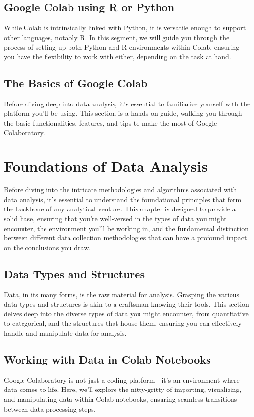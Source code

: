 \documentclass[a4paper,12pt]{book}
\begin{document}
\section{Google Colab using R or Python}
While Colab is intrinsically linked with Python, it is versatile enough to support other languages, notably R. In this segment, we will guide you through the process of setting up both Python and R environments within Colab, ensuring you have the flexibility to work with either, depending on the task at hand.

\section{The Basics of Google Colab}
Before diving deep into data analysis, it's essential to familiarize yourself with the platform you'll be using. This section is a hands-on guide, walking you through the basic functionalities, features, and tips to make the most of Google Colaboratory.

\chapter{Foundations of Data Analysis}
Before diving into the intricate methodologies and algorithms associated with data analysis, it's essential to understand the foundational principles that form the backbone of any analytical venture. This chapter is designed to provide a solid base, ensuring that you're well-versed in the types of data you might encounter, the environment you'll be working in, and the fundamental distinction between different data collection methodologies that can have a profound impact on the conclusions you draw.

\section{Data Types and Structures}
Data, in its many forms, is the raw material for analysis. Grasping the various data types and structures is akin to a craftsman knowing their tools. This section delves deep into the diverse types of data you might encounter, from quantitative to categorical, and the structures that house them, ensuring you can effectively handle and manipulate data for analysis.

\section{Working with Data in Colab Notebooks}
Google Colaboratory is not just a coding platform—it's an environment where data comes to life. Here, we'll explore the nitty-gritty of importing, visualizing, and manipulating data within Colab notebooks, ensuring seamless transitions between data processing steps.
\end{document}
